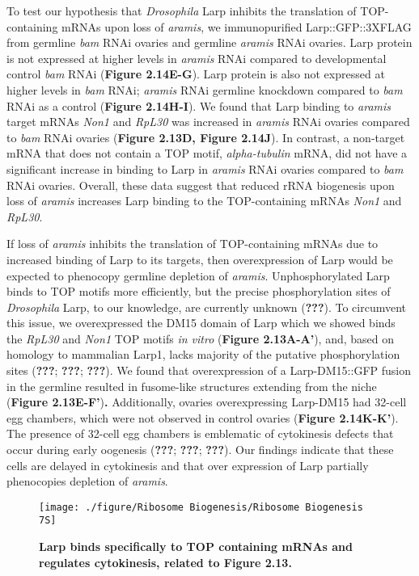 \documentclass[12pt,oneside]{reedthesis}
\begin{document}
To test our hypothesis that \emph{Drosophila} Larp inhibits the translation of TOP-containing mRNAs upon loss of \emph{aramis}, we immunopurified Larp::GFP::3XFLAG from germline \emph{bam} RNAi ovaries and germline \emph{aramis} RNAi ovaries. Larp protein is not expressed at higher levels in \emph{aramis} RNAi compared to developmental control \emph{bam} RNAi (\textbf{Figure 2.14E-G}). Larp protein is also not expressed at higher levels in \emph{bam} RNAi; \emph{aramis} RNAi germline knockdown compared to \emph{bam} RNAi as a control (\textbf{Figure 2.14H-I}). We found that Larp binding to \emph{aramis} target mRNAs \emph{Non1} and \emph{RpL30} was increased in \emph{aramis} RNAi ovaries compared to \emph{bam} RNAi ovaries (\textbf{Figure 2.13D, Figure 2.14J}). In contrast, a non-target mRNA that does not contain a TOP motif, \emph{alpha-tubulin} mRNA, did not have a significant increase in binding to Larp in \emph{aramis} RNAi ovaries compared to \emph{bam} RNAi ovaries. Overall, these data suggest that reduced rRNA biogenesis upon loss of \emph{aramis} increases Larp binding to the TOP-containing mRNAs \emph{Non1} and \emph{RpL30}.

If loss of \emph{aramis} inhibits the translation of TOP-containing mRNAs due to increased binding of Larp to its targets, then overexpression of Larp would be expected to phenocopy germline depletion of \emph{aramis}. Unphosphorylated Larp binds to TOP motifs more efficiently, but the precise phosphorylation sites of \emph{Drosophila} Larp, to our knowledge, are currently unknown ({\textbf{???}}). To circumvent this issue, we overexpressed the DM15 domain of Larp which we showed binds the \emph{RpL30} and \emph{Non1} TOP motifs \emph{in vitro} (\textbf{Figure 2.13A-A'}), and, based on homology to mammalian Larp1, lacks majority of the putative phosphorylation sites ({\textbf{???}}; {\textbf{???}}; {\textbf{???}}). We found that overexpression of a Larp-DM15::GFP fusion in the germline resulted in fusome-like structures extending from the niche (\textbf{Figure 2.13E-F'})\textbf{.} Additionally, ovaries overexpressing Larp-DM15 had 32-cell egg chambers, which were not observed in control ovaries (\textbf{Figure 2.14K-K'}). The presence of 32-cell egg chambers is emblematic of cytokinesis defects that occur during early oogenesis ({\textbf{???}}; {\textbf{???}}; {\textbf{???}}). Our findings indicate that these cells are delayed in cytokinesis and that over expression of Larp partially phenocopies depletion of \emph{aramis}.
\begin{figure}

{\centering \texttt{[image: ./figure/Ribosome Biogenesis/Ribosome Biogenesis 7S]} 

}

\caption[\textbf{Larp binds specifically to TOP containing mRNAs and regulates cytokinesis, related to Figure 2.13.}]{\textbf{Larp binds specifically to TOP containing mRNAs and regulates cytokinesis, related to Figure 2.13.}}\label{fig:unnamed-chunk-19}
\end{figure}
\end{document}
